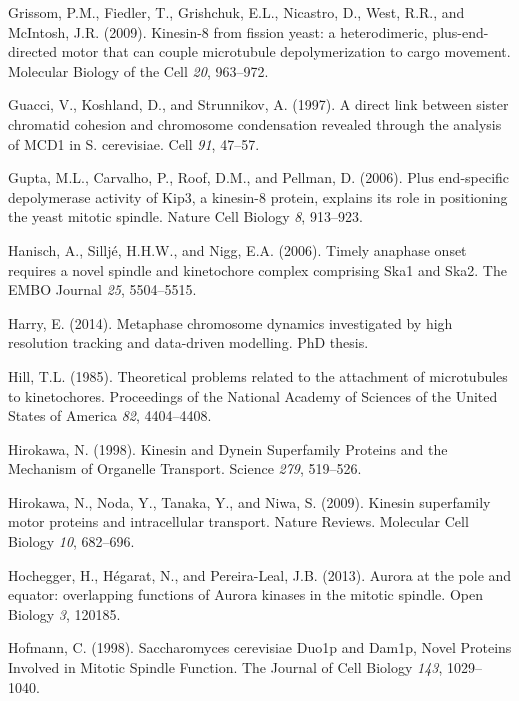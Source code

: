 \documentclass[12pt,a4paper,twoside,openright]{book}
\begin{document}
\hypertarget{ref-Grissom2009}{}
Grissom, P.M., Fiedler, T., Grishchuk, E.L., Nicastro, D., West, R.R.,
and McIntosh, J.R. (2009). Kinesin-8 from fission yeast: a
heterodimeric, plus-end-directed motor that can couple microtubule
depolymerization to cargo movement. Molecular Biology of the Cell
\emph{20}, 963--972.

\hypertarget{ref-Guacci1997}{}
Guacci, V., Koshland, D., and Strunnikov, A. (1997). A direct link
between sister chromatid cohesion and chromosome condensation revealed
through the analysis of MCD1 in S. cerevisiae. Cell \emph{91}, 47--57.

\hypertarget{ref-Gupta2006}{}
Gupta, M.L., Carvalho, P., Roof, D.M., and Pellman, D. (2006). Plus
end-specific depolymerase activity of Kip3, a kinesin-8 protein,
explains its role in positioning the yeast mitotic spindle. Nature Cell
Biology \emph{8}, 913--923.

\hypertarget{ref-Hanisch2006}{}
Hanisch, A., Silljé, H.H.W., and Nigg, E.A. (2006). Timely anaphase
onset requires a novel spindle and kinetochore complex comprising Ska1
and Ska2. The EMBO Journal \emph{25}, 5504--5515.

\hypertarget{ref-Harry2014}{}
Harry, E. (2014). Metaphase chromosome dynamics investigated by high
resolution tracking and data-driven modelling. PhD thesis.

\hypertarget{ref-Hill1985}{}
Hill, T.L. (1985). Theoretical problems related to the attachment of
microtubules to kinetochores. Proceedings of the National Academy of
Sciences of the United States of America \emph{82}, 4404--4408.

\hypertarget{ref-Hirokawa1998}{}
Hirokawa, N. (1998). Kinesin and Dynein Superfamily Proteins and the
Mechanism of Organelle Transport. Science \emph{279}, 519--526.

\hypertarget{ref-Hirokawa2009}{}
Hirokawa, N., Noda, Y., Tanaka, Y., and Niwa, S. (2009). Kinesin
superfamily motor proteins and intracellular transport. Nature Reviews.
Molecular Cell Biology \emph{10}, 682--696.

\hypertarget{ref-Hochegger2013}{}
Hochegger, H., Hégarat, N., and Pereira-Leal, J.B. (2013). Aurora at the
pole and equator: overlapping functions of Aurora kinases in the mitotic
spindle. Open Biology \emph{3}, 120185.

\hypertarget{ref-Hofmann1998}{}
Hofmann, C. (1998). Saccharomyces cerevisiae Duo1p and Dam1p, Novel
Proteins Involved in Mitotic Spindle Function. The Journal of Cell
Biology \emph{143}, 1029--1040.
\end{document}
